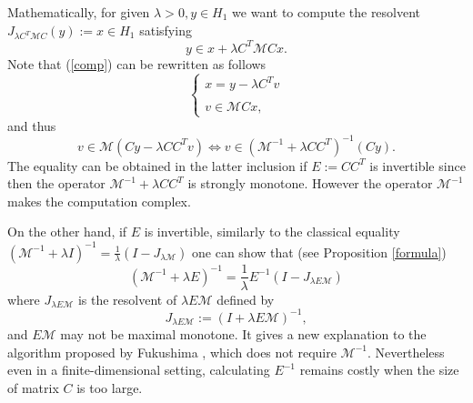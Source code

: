 \documentclass[11pt]{article}
\def\beq{\begin{equation}}
\def\eeq{\end{equation}}
\theoremstyle{plain}
\begin{document}
Mathematically, for given $\lambda >0, y\in H_1$ we want to compute the resolvent $J_{\lambda C^T\mathcal{M}C}(y):=x\in H_1$ satisfying 
\beq\label{comp}
y\in x+ \lambda C^T\mathcal{M}C x.
\eeq
Note that  (\ref{comp}) can be rewritten as follows 
\begin{equation}\label{lmiso}
\left\{
\begin{array}{l}
x=y-\lambda C^T v\\ \\
v\in \mathcal{M}C x,
\end{array}\right.
\end{equation}
and  thus  
$$
v \in \mathcal{M}(Cy-\lambda CC^Tv) \Leftrightarrow v \in (\mathcal{M}^{-1}+\lambda CC^T)^{-1}(Cy).
$$
The equality can be obtained in the latter inclusion if $E:=CC^T$ is invertible \cite{Robinson} since then the operator $\mathcal{M}^{-1}+\lambda CC^T$ is strongly monotone. However the operator $\mathcal{M}^{-1}$  makes the computation complex. 

On the other hand, if $E$ is invertible, similarly to the classical equality $(\mathcal{M}^{-1}+\lambda I)^{-1}=\frac{1}{\lambda}(I-J_{\lambda \mathcal{M}})$ one can show that (see Proposition \ref{formula})
$$
(\mathcal{M}^{-1}+\lambda E)^{-1}=\frac{1}{\lambda}E^{-1}(I-J_{\lambda E\mathcal{M}})
$$
where $J_{\lambda E\mathcal{M}}$ is the resolvent of $\lambda E\mathcal{M}$ defined by 
$$
J_{\lambda E\mathcal{M}}:=(I+\lambda E\mathcal{M})^{-1},
$$
and $E\mathcal{M}$ may not be maximal monotone. 
 It gives a new explanation to the algorithm proposed by  Fukushima \cite{Fukushima}, which does not require $\mathcal{M}^{-1}$. {{Nevertheless} even in a finite-dimensional setting, calculating $E^{-1}$ remains costly when the size of matrix $C$ is too large.}
\end{document}

